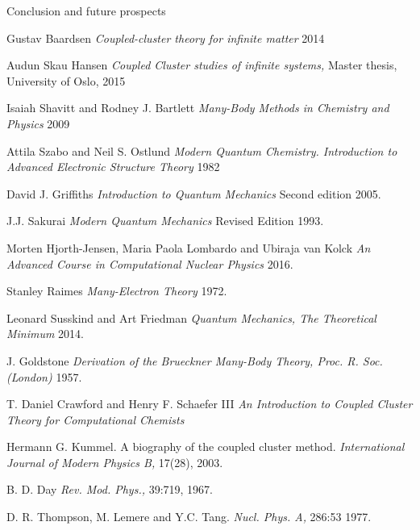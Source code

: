 \documentclass[twoside,english]{uiofysmaster}
\begin{document}
\begin{chapter}{Conclusion and future prospects}
	
\end{chapter}


\medskip


\begin{thebibliography}{9}

	Gustav Baardsen
	\textit{Coupled-cluster theory for infinite matter} 2014

	Audun Skau Hansen
	\textit{Coupled Cluster studies of infinite systems,} Master thesis, University of Oslo, 2015

	Isaiah Shavitt and Rodney J. Bartlett
	\textit{Many-Body Methods in Chemistry and Physics} 2009

	Attila Szabo and Neil S. Ostlund
	\textit{Modern Quantum Chemistry. Introduction to Advanced Electronic Structure Theory} 1982

	David J. Griffiths
	\textit{Introduction to Quantum Mechanics} Second edition 2005.

	J.J. Sakurai
	\textit{Modern Quantum Mechanics} Revised Edition 1993.

	Morten Hjorth-Jensen, Maria Paola Lombardo and Ubiraja van Kolck
	\textit{An Advanced Course in Computational Nuclear Physics} 2016.

	Stanley Raimes
	\textit{Many-Electron Theory} 1972.

	Leonard Susskind and Art Friedman
	\textit{Quantum Mechanics, The Theoretical Minimum} 2014.

	J. Goldstone
	\textit{Derivation of the Brueckner Many-Body Theory, Proc. R. Soc. (London)} 1957. 

	T. Daniel Crawford and Henry F. Schaefer III
	\textit{An Introduction to Coupled Cluster Theory for Computational Chemists} 

	Hermann G. Kummel. A biography of the coupled cluster method. 
	\textit{International Journal of Modern Physics B,} 17(28), 2003. 

	B. D. Day
	\textit{Rev. Mod. Phys.,}
	39:719, 1967.

	D. R. Thompson, M. Lemere and Y.C. Tang.
	\textit{Nucl. Phys. A,} 286:53 1977.


\end{thebibliography}
\end{document}
